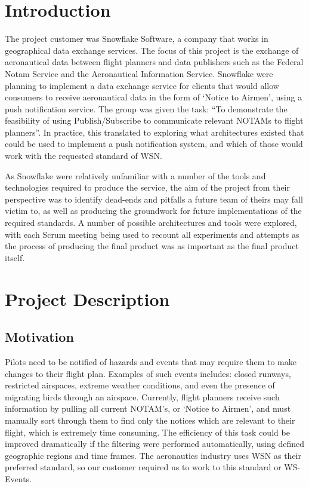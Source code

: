 \documentclass[a4paper, 12pt, twoside]{article}
\begin{document}
\newpage

\tableofcontents
\newpage

\listoffigures
\newpage

\section{Introduction}
\label{sec:introduction}

The project customer was Snowflake Software, a company that works in geographical data exchange services. The focus of this project is the exchange of aeronautical data between flight planners and data publishers such as the Federal Notam Service and the Aeronautical Information Service. Snowflake were planning to implement a data exchange service for clients that would allow consumers to receive aeronautical data in the form of `Notice to Airmen', using a push notification service. The group was given the task: ``To demonstrate the feasibility of using Publish/Subscribe to communicate relevant NOTAMs to flight planners''. In practice, this translated to exploring what architectures existed that could be used to implement a push notification system, and which of those would work with the requested standard of WSN.

As Snowflake were relatively unfamiliar with a number of the tools and technologies required to produce the service, the aim of the project from their perspective was to identify dead-ends and pitfalls a future team of theirs may fall victim to, as well as producing the groundwork for future implementations of the required standards. A number of possible architectures and tools were explored, with each Scrum meeting being used to recount all experiments and attempts as the process of producing the final product was as important as the final product itself.

\newpage

\section{Project Description}
\subsection{Motivation}
\label{sec:intro_motivation}
Pilots need to be notified of hazards and events that may require them to make changes to their flight plan. Examples of such events includes: closed runways, restricted airspaces, extreme weather conditions, and even the presence of migrating birds through an airspace. Currently, flight planners receive such information by pulling all current NOTAM's, or `Notice to Airmen', and must manually sort through them to find only the notices which are relevant to their flight, which is extremely time consuming. The efficiency of this task could be improved dramatically if the filtering were performed automatically, using defined geographic regions and time frames. The aeronautics industry uses WSN as their preferred standard, so our customer required us to work to this standard or WS-Events.
\end{document}
